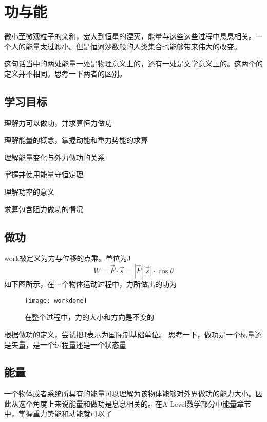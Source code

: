 \chapter{功与能}
\label{Work and Energy}
微小至微观粒子的亲和，宏大到恒星的湮灭，能量与这些这些过程中息息相关。一个人的能量太过渺小。但是恒河沙数般的人类集合也能够带来伟大的改变。

\begin{TaskBox}
这句话当中的两处能量一处是物理意义上的，还有一处是文学意义上的。这两个的定义并不相同。思考一下两者的区别。
\end{TaskBox}

\section*{学习目标}
\begin{todolist}
 \item 理解力可以做功，并求算恒力做功
 \item 理解能量的概念，掌握动能和重力势能的求算
 \item 理解能量变化与外力做功的关系
 \item 掌握并使用能量守恒定理
 \item 理解功率的意义
 \item 求算包含阻力做功的情况
\end{todolist}
\clearpage


\section{做功}
\label{sec:Work done}

\gls{work}被定义为力与位移的点乘。单位为\si{\J}
\[
	W=\vec{F}\cdot \vec{s}=|\vec{F}||\vec{s}|\cdot \cos{\theta}
\]
如下图所示，在一个物体运动过程中，力所做出的功为
\begin{figure}[H]
\centering
\texttt{[image: workdone]}
\caption{在整个过程中，力的大小和方向是不变的}
\end{figure}

\begin{TaskBox}
根据做功的定义，尝试把\si{\J}表示为国际制基础单位。
\tcblower
思考一下，做功是一个标量还是矢量，是一个过程量还是一个状态量
\end{TaskBox}
\clearpage

\section{能量}
\label{sec:Energy}
一个物体或者系统所具有的能量可以理解为该物体能够对外界做功的能力大小。因此从这个角度上来说能量和做功是息息相关的。在A Level数学部分中能量章节中，掌握重力势能和动能就可以了

